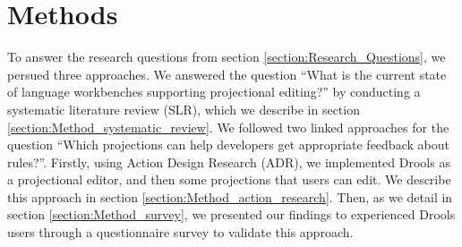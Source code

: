 \chapter{Methods}
\label{chapter:Methods}

To answer the research questions from section \ref{section:Research_Questions}, we persued three approaches.
We answered the question ``What is the current state of language workbenches supporting projectional editing?'' by conducting a systematic literature review (SLR), which we describe in section \ref{section:Method_systematic_review}.
We followed two linked approaches for the question ``Which projections can help developers get appropriate feedback about rules?''.
Firstly, using Action Design Research (ADR), we implemented Drools as a projectional editor, and then some projections that users can edit.
We describe this approach in section \ref{section:Method_action_research}.
Then, as we detail in section \ref{section:Method_survey}, we presented our findings to experienced Drools users through a questionnaire survey to validate this approach.


\newpage

\newpage

